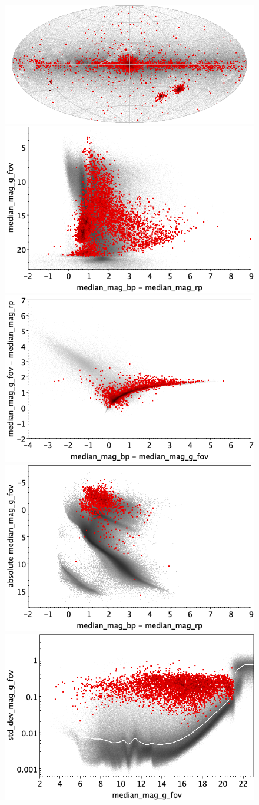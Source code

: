 \documentclass[longauth]{aa}
\begin{document}
\begin{appendix}
\begin{figure}
\centering
{} \includegraphics[width=0.6\hsize]{figures/appendix/CEP_trn_sky.png} \\ %
\vspace{4mm}
 \includegraphics[width=0.45\hsize]{figures/appendix/CEP_trn_cm.png}  %
\hspace{2mm}
 \includegraphics[width=0.45\hsize]{figures/appendix/CEP_trn_cc.png} \\ %
\vspace{4mm}
 \includegraphics[width=0.45\hsize]{figures/appendix/CEP_trn_cam.png}  %
\hspace{2mm}
 \includegraphics[width=0.45\hsize]{figures/appendix/CEP_trn_msd.png} \\ %

\end{figure}
\end{appendix}
\end{document}
